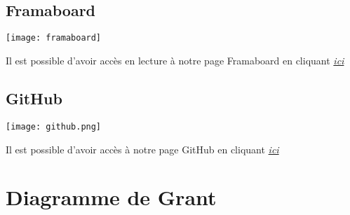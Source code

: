 ~\\
~\\

\subsection{Framaboard}
\begin{center}
\texttt{[image: framaboard]}
\end{center}
Il est possible d'avoir accès en lecture à notre page Framaboard en cliquant  \textit{\href{https://smart.framaboard.org/?controller=board&action=readonly&token=ab1e20bb26472df067dc24cbd84d9b28eea71bfd68bdea07ab5a9b555ce0}{ici}}

\subsection{GitHub}
\begin{center}
\texttt{[image: github.png]}
\end{center}
Il est possible d'avoir accès à notre page GitHub en cliquant  \textit{\href{https://github.com/magichal/SMART}{ici}}


\newpage



\section{Diagramme de Grant}




